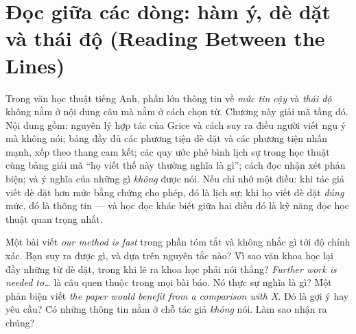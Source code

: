 \documentclass[../../english.tex]{subfiles}
\begin{document}
\chapter{Đọc giữa các dòng: hàm ý, dè dặt và thái độ (Reading Between the Lines)}

\begin{tomtat}
Trong văn học thuật tiếng Anh, phần lớn thông tin về \emph{mức tin cậy} và \emph{thái độ} không nằm ở nội dung câu mà nằm ở cách chọn từ. Chương này giải mã tầng đó. Nội dung gồm: nguyên lý hợp tác của Grice và cách suy ra điều người viết ngụ ý mà không nói; bảng đầy đủ các phương tiện dè dặt và các phương tiện nhấn mạnh, xếp theo thang cam kết; các quy ước phê bình lịch sự trong học thuật cùng bảng giải mã ``họ viết thế này thường nghĩa là gì''; cách đọc nhận xét phản biện; và ý nghĩa của những gì \emph{không} được nói. Nếu chỉ nhớ một điều: khi tác giả viết dè dặt hơn mức bằng chứng cho phép, đó là lịch sự; khi họ viết dè dặt \emph{đúng} mức, đó là thông tin --- và học đọc khác biệt giữa hai điều đó là kỹ năng đọc học thuật quan trọng nhất.
\end{tomtat}

\begin{nentang}
\end{nentang}

\begin{khoigoi}
\h{Một bài viết \emph{our method is fast} trong phần tóm tắt và không nhắc gì tới độ chính xác. Bạn suy ra được gì, và dựa trên nguyên tắc nào?}
\h{Vì sao văn khoa học lại đầy những từ dè dặt, trong khi lẽ ra khoa học phải nói thẳng?}
\h{\emph{Further work is needed to\ldots} là câu quen thuộc trong mọi bài báo. Nó thực sự nghĩa là gì?}
\h{Một phản biện viết \emph{the paper would benefit from a comparison with X}. Đó là gợi ý hay yêu cầu?}
\h{Có những thông tin nằm ở chỗ tác giả \emph{không} nói. Làm sao nhận ra chúng?}
\end{khoigoi}
\end{document}
